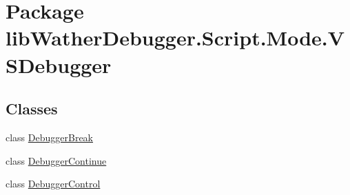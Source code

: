 \hypertarget{namespacelib_wather_debugger_1_1_script_1_1_mode_1_1_v_s_debugger}{\section{Package lib\+Wather\+Debugger.\+Script.\+Mode.\+V\+S\+Debugger}
\label{namespacelib_wather_debugger_1_1_script_1_1_mode_1_1_v_s_debugger}
}
\subsection*{Classes}
\begin{DoxyCompactItemize}
\item 
class \hyperlink{classlib_wather_debugger_1_1_script_1_1_mode_1_1_v_s_debugger_1_1_debugger_break}{Debugger\+Break}
\item 
class \hyperlink{classlib_wather_debugger_1_1_script_1_1_mode_1_1_v_s_debugger_1_1_debugger_continue}{Debugger\+Continue}
\item 
class \hyperlink{classlib_wather_debugger_1_1_script_1_1_mode_1_1_v_s_debugger_1_1_debugger_control}{Debugger\+Control}
\end{DoxyCompactItemize}

